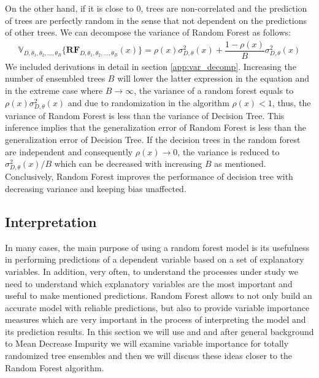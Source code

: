 On the other hand, if it is close to 0, trees are non-correlated and 
the prediction of trees are perfectly random in the sense that 
not dependent on the predictions of other trees. 
We can decompose the variance of Random Forest as follows:
\begin{align}\label{eq:decomp_var}
\mathbb{V}_{D, \theta_{1}, \theta_{2},..., \theta_{B}}\{\boldsymbol{RF}_{D, \theta_{1},\theta_{2},..., \theta_{B}}(x) \}  = \rho(x)\sigma^2_{D,\theta}(x) + \dfrac{1-\rho(x)}{B}\sigma^2_{D,\theta}(x)
\end{align}
We included derivations in detail in section \ref{app:var_decomp}. 
Increasing the number of ensembled trees $B$ will lower the latter expression in the equation and in the extreme 
case where $B \rightarrow \infty $, the variance of a random forest equals to $\rho(x)\sigma^2_{D,\theta}(x)$ 
and due to randomization in the algorithm $\rho(x) < 1$, 
thus, the variance of Random Forest is less than the variance of Decision Tree. 
This inference implies that the generalization error of Random Forest is less than the generalization error of Decision Tree. 
If the decision trees in the random forest are independent 
and consequently $\rho(x) \rightarrow 0$, the variance is reduced to $\sigma^2_{D,\theta}(x)/B$ 
which can be decreased with increasing $B$ as mentioned. 
Conclusively, Random Forest improves the performance of decision tree with decreasing variance and keeping bias unaffected.

\subsection{Interpretation}
In many cases, the main purpose of using a random forest model is its usefulness in performing predictions of a dependent variable
based on a set of explanatory variables. In addition, very often, to understand the processes under study we need to understand
which explanatory variables are the most important and useful to make mentioned predictions. 
Random Forest allows to not only build an accurate model with reliable predictions, 
but also to provide variable importance measures which are very important in the process of interpreting the model and 
its prediction results. In this section we will use \cite{louppe2013understanding} 
and \cite{gerard2016foresttour} and after general background to Mean Decrease Impurity we will examine variable importance for totally randomized tree ensembles and then we will discuss these ideas closer to the Random Forest algorithm.

